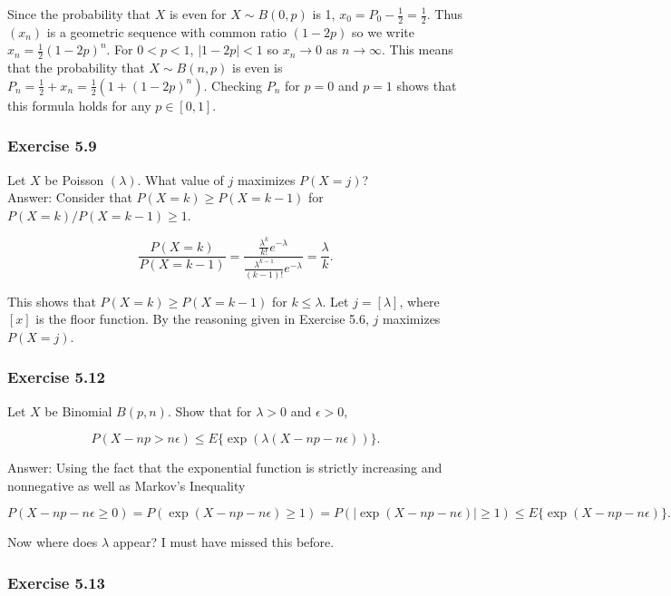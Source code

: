 \documentclass{article}
\begin{document}
{Since the probability that $X$ is even for $X \sim B(0,p)$ is 1, $x_0 = P_0 - \frac{1}{2} = \frac{1}{2}$. Thus $(x_n)$ is a geometric sequence with common ratio $(1-2p)$ so we write $x_n = \frac{1}{2}(1-2p)^n$. For $0<p<1$, $|1-2p| < 1$ so $x_n \rightarrow 0$ as $n \rightarrow \infty$. This means that the probability that $X \sim B(n,p)$ is even is $P_n = \frac{1}{2} + x_n = \frac{1}{2}(1 +(1-2p)^n)$. Checking $P_n$ for $p = 0$ and $p=1$ shows that this formula holds for any $p \in [0,1]$. 

\subsubsection*{Exercise 5.9}

Let $X$ be Poisson $(\lambda)$. What value of $j$ maximizes $P(X = j)$?\\

Answer: Consider that $P(X = k) \geq P(X = k-1)$ for $P(X = k) / P(X = k-1) \geq 1$. 

$$
\frac{P(X = k)}{P(X = k-1)} = \frac{\frac{\lambda^k}{k!}e^{-\lambda}}{\frac{\lambda^{k-1}}{(k-1)!}e^{-\lambda}} = \frac{\lambda}{k}.
$$

This shows that $P(X = k) \geq P(X = k-1)$ for $k \leq \lambda$. Let $j = [\lambda]$, where $[x]$ is the floor function. By the reasoning given in Exercise 5.6, $j$ maximizes $P(X = j)$. 

\subsubsection*{Exercise 5.12}

Let $X$ be Binomial $B(p, n)$. Show that for $\lambda > 0$ and $\epsilon > 0$,

$$
P(X - np > n\epsilon) \leq E\{\exp(\lambda(X - np - n\epsilon))\}.
$$

Answer: Using the fact that the exponential function is strictly increasing and nonnegative as well as Markov's Inequality 

$$
P(X - np - n\epsilon \geq 0) =
P(\exp(X - np - n\epsilon) \geq 1)
=P(|\exp(X - np - n\epsilon)| \geq 1) 
\leq E\{\exp(X - np - n\epsilon)\}.
$$

Now where does $\lambda$ appear? I must have missed this before. 


\subsubsection*{Exercise 5.13}

}
\end{document}
